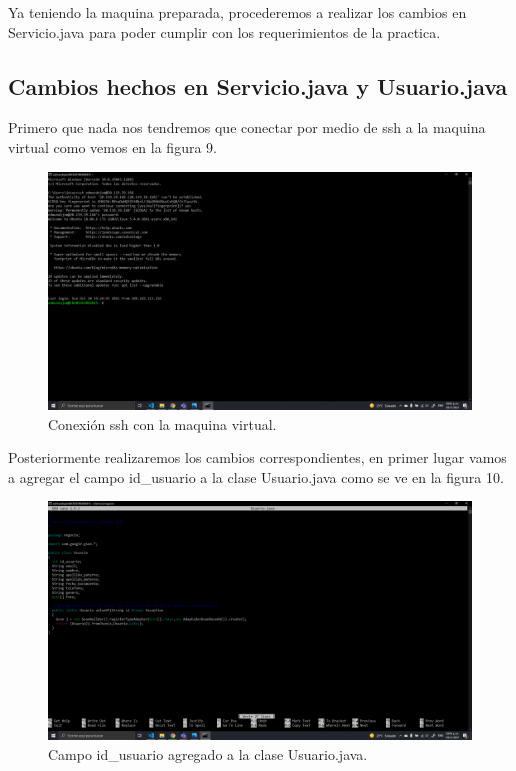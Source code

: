 \documentclass[11pt]{article}
\begin{document}
		Ya teniendo la maquina preparada, procederemos a realizar los cambios en Servicio.java para poder cumplir con los requerimientos de la practica.
		\subsection{Cambios hechos en Servicio.java y Usuario.java}
		Primero que nada nos tendremos que conectar por medio de ssh a la maquina virtual como vemos en la figura 9.
		\begin{figure}[H]
			\centering
			\includegraphics[scale=0.34]{resources/conexionssh.png}
			\caption{Conexión ssh con la maquina virtual.}\label{fig:picture}
		\end{figure}
		Posteriormente realizaremos los cambios correspondientes, en primer lugar vamos a agregar el campo id\_usuario a la clase Usuario.java como se ve en la figura 10.
		\begin{figure}[H]
			\centering
			\includegraphics[scale=0.34]{resources/p1.png}
			\caption{Campo id\_usuario agregado a la clase Usuario.java.}\label{fig:picture}
		\end{figure}
\end{document}
